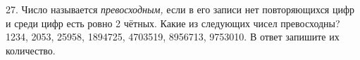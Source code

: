 27. Число называется {\it превосходным,} если в его записи нет повторяющихся цифр и среди цифр есть ровно 2 чётных. Какие из следующих чисел превосходны? 1234, 2053, 25958, 1894725, 4703519, 8956713, 9753010. В ответ запишите их количество.\\
